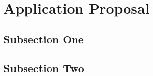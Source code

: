 \section{Application Proposal}

\subsection{Subsection One}

\lipsum[7] %

\subsection{Subsection Two}

\lipsum[8] %
